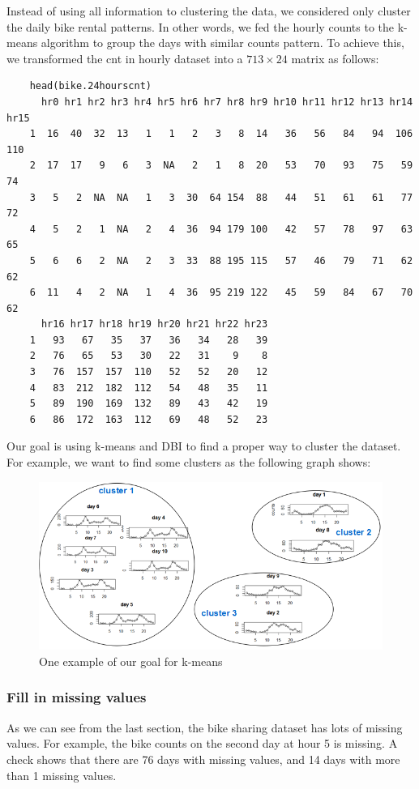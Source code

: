 \documentclass[12pt]{article}
\begin{document}
	Instead of using all information to clustering the data, we considered only cluster the daily bike rental patterns. In other words, we fed the hourly counts to the k-means algorithm to group the days with similar counts pattern. To achieve this, we transformed the cnt in hourly dataset into a $713 \times 24$ matrix as follows: \color{blue}
	\begin{verbatim} 
	head(bike.24hourscnt)
 	  hr0 hr1 hr2 hr3 hr4 hr5 hr6 hr7 hr8 hr9 hr10 hr11 hr12 hr13 hr14 hr15
	1  16  40  32  13   1   1   2   3   8  14   36   56   84   94  106  110
	2  17  17   9   6   3  NA   2   1   8  20   53   70   93   75   59   74
	3   5   2  NA  NA   1   3  30  64 154  88   44   51   61   61   77   72
	4   5   2   1  NA   2   4  36  94 179 100   42   57   78   97   63   65
	5   6   6   2  NA   2   3  33  88 195 115   57   46   79   71   62   62
	6  11   4   2  NA   1   4  36  95 219 122   45   59   84   67   70   62
	  hr16 hr17 hr18 hr19 hr20 hr21 hr22 hr23
	1   93   67   35   37   36   34   28   39
	2   76   65   53   30   22   31    9    8
	3   76  157  157  110   52   52   20   12
	4   83  212  182  112   54   48   35   11
	5   89  190  169  132   89   43   42   19
	6   86  172  163  112   69   48   52   23
	\end{verbatim} \color{black}
	Our goal is using k-means and DBI to find a proper way to cluster the dataset. For example, we want to find some clusters as the following graph shows:
	\begin{figure}[H]
		\centering
		\includegraphics[scale=.8]{figures/cluster_goal.png}
		\caption{One example of our goal for k-means}
	\end{figure}
	
	
	\subsubsection{Fill in missing values}
	As we can see from the last section, the bike sharing dataset has lots of missing values. For example, the bike counts on the second day at hour 5 is missing. A check shows that there are 76 days with missing values, and 14 days with more than 1 missing values. 
	
\end{document}
